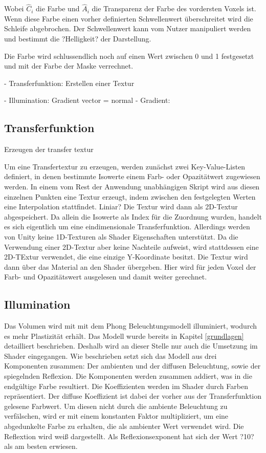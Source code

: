 Wobei $\hat{C}_{i}$ die Farbe und $\hat{A}_{i}$ die Transparenz der Farbe des vordersten Voxels ist.
Wenn diese Farbe einen vorher definierten Schwellenwert überschreitet wird die Schleife abgebrochen. Der Schwellenwert kann vom Nutzer manipuliert werden und bestimmt die ?Helligkeit? der Darstellung.

Die Farbe wird schlussendlich noch auf einen Wert zwischen 0 und 1 festgesetzt und mit der Farbe der Maske verrechnet.



- Transferfunktion: Erstellen einer Textur

- Illumination: Gradient vector = normal
- Gradient: 



\subsection{Transferfunktion}
\label{transfer}

Erzeugen der transfer textur

Um eine Transfertextur zu erzeugen, werden zunächst zwei Key-Value-Listen definiert, in denen bestimmte Isowerte einem Farb- oder Opazitätwert zugewiesen werden. In einem vom Rest der Anwendung unabhängigen Skript wird aus diesen einzelnen Punkten eine Textur erzeugt, indem zwischen den festgelegten Werten eine Interpolation stattfindet.
Liniar?
Die Textur wird dann als 2D-Textur abgespeichert. Da allein die Isowerte als Index für die Zuordnung wurden, handelt es sich eigentlich um eine eindimensionale Transferfunktion. 
Allerdings werden von Unity keine 1D-Texturen als Shader Eigenschaften unterstützt. Da die Verwendung einer 2D-Textur aber keine Nachteile aufweist, wird stattdessen eine 2D-TExtur verwendet, die eine einzige Y-Koordinate besitzt. 
Die Textur wird dann über das Material an den Shader übergeben. Hier wird für jeden Voxel der Farb- und Opazitätswert ausgelesen und damit weiter gerechnet. 

\subsection{Illumination}
\label{illumination}

Das Volumen wird mit mit dem Phong Beleuchtungsmodell illuminiert, wodurch es mehr Plastizität erhält. Das Modell wurde bereits in Kapitel \ref{grundlagen} detailliert beschrieben. Deshalb wird an dieser Stelle nur auch die Umsetzung im Shader eingegangen.
Wie beschrieben setzt sich das Modell aus drei Komponenten zusammen: Der ambienten und der diffusen Beleuchtung, sowie der spiegelnden Reflexion. Die Komponenten werden zusammen addiert, was in die endgültige Farbe resultiert. 
Die Koeffizienten werden im Shader durch Farben repräsentiert. Der diffuse Koeffizient ist dabei der vorher aus der Transferfunktion gelesene Farbwert. Um diesen nicht durch die ambiente Beleuchtung zu verfälschen, wird er mit einem konstanten Faktor multipliziert, um eine abgedunkelte Farbe zu erhalten, die als ambienter Wert verwendet wird. Die Reflextion wird weiß dargestellt.
Als Reflexionsexponent hat sich der Wert ?10? als am besten erwiesen.

